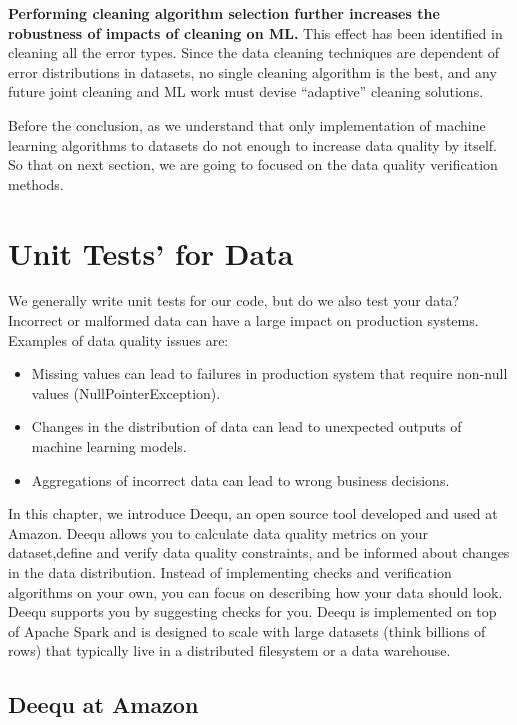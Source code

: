 \textbf{Performing cleaning algorithm selection further increases the robustness of impacts of cleaning on ML. }This effect has been identified in cleaning all the error types. Since the data cleaning techniques are dependent of error distributions in datasets, no single cleaning algorithm is the best, and any future joint cleaning and
ML work must devise “adaptive” cleaning solutions.

Before the conclusion, as we understand that only implementation of machine learning algorithms to datasets do not enough to increase data quality by itself. So that on next section, we are going to focused on the data quality verification methods.  

\section{Unit Tests' for Data} \label{sec:unit-test-for-data}

We generally write unit tests for our code, but do we also test your data? Incorrect or malformed data can have a large impact on production systems. 
Examples of data quality issues are:

\begin{itemize}
	\item {Missing values can lead to failures in production system that require non-null values (NullPointerException).
	}	
	\item {
		Changes in the distribution of data can lead to unexpected outputs of machine learning models.
	}
	\item {
		Aggregations of incorrect data can lead to wrong business decisions.
	}
\end{itemize}

In this chapter, we introduce Deequ, an open source tool developed and used at Amazon. Deequ allows you to calculate data quality metrics on your dataset,define and verify data quality constraints, and be informed about changes in the data distribution. Instead of implementing checks and verification algorithms on your own, you can focus on describing how your data should look. 
Deequ supports you by suggesting checks for you. Deequ is implemented on top of Apache Spark and is designed to 
scale with large datasets (think billions of rows) that typically live in a distributed filesystem or a data warehouse.

\subsection{Deequ at Amazon}

